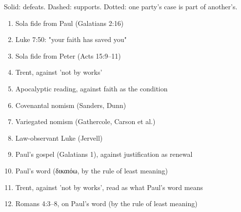 \documentclass[11pt]{article}
\begin{document}
\noindent Solid: defeats. Dashed: supports. Dotted: one party's case is part of another's.
\begin{enumerate}
\item Sola fide from Paul (Galatians 2:16)
\item Luke 7:50: "your faith has saved you"
\item Sola fide from Peter (Acts 15:9–11)
\item Trent, against 'not by works'
\item Apocalyptic reading, against faith as the condition
\item Covenantal nomism (Sanders, Dunn)
\item Variegated nomism (Gathercole, Carson et al.)
\item Law-observant Luke (Jervell)
\item Paul's gospel (Galatians 1), against justification as renewal
\item Paul's word (δικαιόω, by the rule of least meaning)
\item Trent, against 'not by works', read as what Paul's word means
\item Romans 4:3–8, on Paul's word (by the rule of least meaning)
\end{enumerate}
\end{document}
